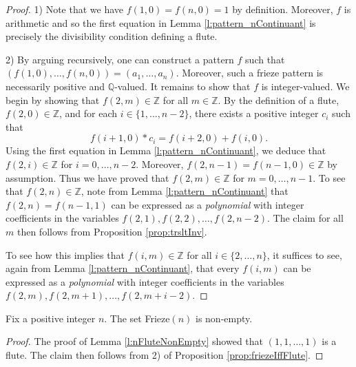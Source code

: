 \begin{proof}
    1) Note that we have $f(1,0) = f(n,0) = 1$ by definition. Moreover, $f$ is arithmetic and so the first 
    equation in Lemma \ref{l:pattern_nContinuant} is precisely the divisibility condition defining a flute.

    2) By arguing recursively, one can construct a pattern $f$ such that $ (f (1,0), \ldots, f (n,0)) = (a_1, \ldots, a_n)$. 
    Moreover, such a frieze pattern is necessarily positive and $\mathbb{Q}$-valued. It remains to show that $f$ is integer-valued. 
    We begin by showing that $f (2,m) \in \mathbb{Z}$ for all $m \in \mathbb{Z}$. 
    By the definition of a flute, $f (2,0) \in \mathbb{Z}$, and for each 
    $i \in \{1,\ldots, n-2\}$, there exists a positive integer $c_i$ such that
    \[
        f(i+1,0) * c_i = f (i+2,0) + f (i,0).    
    \]
    Using the first equation in Lemma \ref{l:pattern_nContinuant}, we deduce that $f(2,i) \in \mathbb{Z}$ for $i =0, \ldots, n-2$. 
    Moreover, $ f (2,n-1) = f (n-1,0) \in \mathbb{Z}$ by assumption. Thus we have proved that 
    $f (2,m) \in \mathbb{Z}$ for $m = 0, \ldots, n-1$. To see that $f (2,n) \in \mathbb{Z}$, note from 
    Lemma \ref{l:pattern_nContinuant} that $f (2,n) = f (n-1,1)$ can be expressed as a {\it polynomial} with 
    integer coefficients in the variables $f (2,1), f (2,2),\ldots , f (2,n-2)$. The claim for all $m$ then follows from 
    Proposition \ref{prop:trsltInv}. 

    To see how this implies that $f (i,m) \in \mathbb{Z}$ for all $i \in \{2, \ldots, n\}$, it suffices to 
    see, again from Lemma \ref{l:pattern_nContinuant}, that every $f (i,m)$ can be expressed as a {\it polynomial} with 
    integer coefficients in the variables $f (2,m), f (2,m+1),\ldots , f (2,m+i-2)$.

\end{proof}

\begin{corollary}
    \label{c:arithFriezePatSetNonEmpty}
    \leanok
    Fix a positive integer $n$. The set Frieze$(n)$ is non-empty.
\end{corollary}
\begin{proof}\leanok
    The proof of Lemma \ref{l:nFluteNonEmpty} showed that $(1,1,\ldots, 1)$ is a flute. 
    The claim then follows from 2) of Proposition \ref{prop:friezeIffFlute}.
\end{proof}

